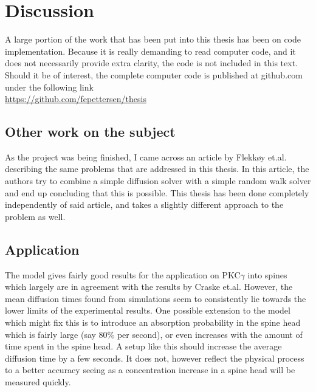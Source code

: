 \section{Discussion}

A large portion of the work that has been put into this thesis has been on code implementation. 
Because it is really demanding to read computer code, and it does not necessarily provide extra clarity, the code is not included in this text. 
Should it be of interest, the complete computer code is published at github.com under the following link\\

\noindent\url{https://github.com/fepettersen/thesis} \\



\subsection{Other work on the subject}

As the project was being finished, I came across an article by Flekkøy et.al.\cite{flekkoy2001coupling} describing the same problems that are addressed in this thesis. 
In this article, the authors try to combine a simple diffusion solver with a simple random walk solver and end up concluding that this is possible. 
This thesis has been done completely independently of said article, and takes a slightly different approach to the problem as well.

\subsection{Application}

The model gives fairly good results for the application on PKC$\gamma$ into spines which largely are in agreement with the results by Craske et.al. 
However, the mean diffusion times found from simulations seem to consistently lie towards the lower limits of the experimental results. 
One possible extension to the model which might fix this is to introduce an absorption probability in the spine head which is fairly large (say 80\% per second), or even increases with the amount of time spent in the spine head. 
A setup like this should increase the average diffusion time by a few seconds. 
It does not, however reflect the physical process to a better accuracy seeing as a concentration increase in a spine head will be measured quickly.

